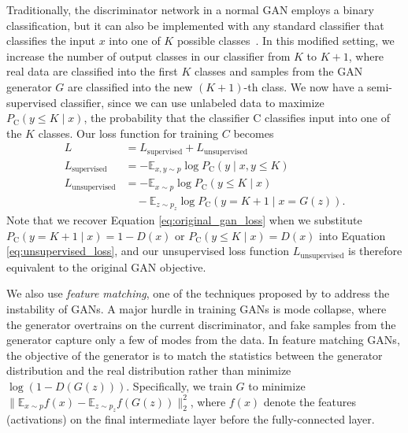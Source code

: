 Traditionally, the discriminator network in a normal GAN employs a binary classification,
but it can also be implemented with any standard classifier that classifies the input $x$
into one of $K$ possible classes~\citep{salimans2016improved, odena2016semi}.
In this modified setting, we increase the number of output classes in our classifier from $K$ to $K+1$,
where real data are classified into the first $K$ classes and samples from the GAN generator $G$ are
classified into the new $\left( K + 1 \right)$-th class.
We now have a semi-supervised classifier, since we can use unlabeled data to maximize
$P_{\mathrm{C}} \left( y \leq K \mid x \right)$,
the probability that the classifier $\mathrm{C}$ classifies input into one of the $K$ classes.
Our loss function for training $C$ becomes
\begin{align}
  L &= L_{\text{supervised}} + L_{\text{unsupervised}}
    \label{eq:total_loss} \\
  L_{\text{supervised}} &= -\mathbb{E}_{x, y \sim p} \log P_{\mathrm{C}} \left( y \mid x, y \leq K \right)
    \label{eq:supervised_loss} \\
  L_{\text{unsupervised}} &= - \mathbb{E}_{x \sim p} \log P_{\mathrm{C}} \left( y \leq K \mid x \right) \nonumber \\
    & \quad - \mathbb{E}_{z \sim p_z} \log P_{\mathrm{C}} \left( y = K + 1 \mid x = G \left( z \right) \right).
    \label{eq:unsupervised_loss}
\end{align}
Note that we recover Equation \ref{eq:original_gan_loss} when we substitute
$P_{\mathrm{C}} \left ( y = K + 1 \mid x \right) = 1 - D(x)$ or
$P_{\mathrm{C}} \left( y \leq K \mid x \right) = D(x)$ into Equation \ref{eq:unsupervised_loss},
and our unsupervised loss function $L_{\text{unsupervised}}$ is therefore equivalent to the original GAN objective.

We also use \textit{feature matching}, one of the techniques proposed by \citet{salimans2016improved} to address
the instability of GANs.
A major hurdle in training GANs is mode collapse, where the generator overtrains on the current discriminator,
and fake samples from the generator capture only a few of modes from the data.
In feature matching GANs, the objective of the generator is to match the statistics between the generator distribution
and the real distribution rather than minimize $\log \left( 1 - D \left( G \left( z \right) \right) \right)$.
Specifically, we train $G$ to minimize
$ \big\lVert \mathbb{E}_{x \sim p} f \left( x \right) - \mathbb{E}_{z \sim p_z} f \left( G \left( z \right) \right) \big\rVert^2_2$,
where $f(x)$ denote the features (\ie activations) on the final intermediate layer before the fully-connected layer.

